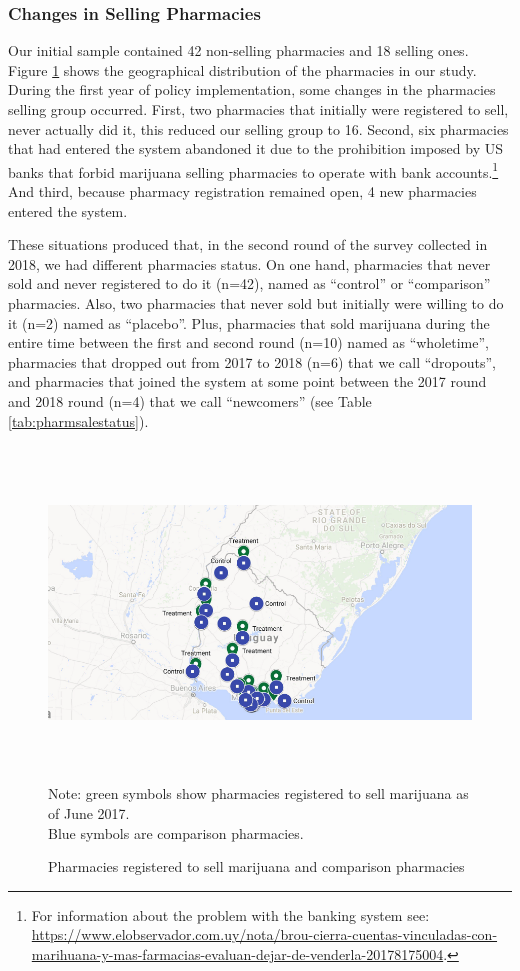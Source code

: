\documentclass[11pt]{article}
\begin{document}
\subsubsection{Changes in Selling Pharmacies}
Our initial sample contained 42 non-selling pharmacies and 18 selling ones. Figure \ref{fig:ctrltrtpharms_1} shows the geographical distribution of the pharmacies in our study. During the first year of policy implementation, some changes in the pharmacies selling group occurred. First, two pharmacies that initially were registered to sell, never actually did it, this reduced our selling group to 16.  Second, six pharmacies that had entered the system abandoned it due to the prohibition imposed by US banks that forbid marijuana selling pharmacies to operate with bank accounts.\footnote{For information about the problem with the banking system see: \url{https://www.elobservador.com.uy/nota/brou-cierra-cuentas-vinculadas-con-marihuana-y-mas-farmacias-evaluan-dejar-de-venderla-20178175004}.} And third, because pharmacy registration remained open, 4 new pharmacies entered the system. 

These situations produced that, in the second round of the survey collected in 2018, we had different pharmacies status. On one hand, pharmacies that never sold and never registered to do it (n=42), named as ``control'' or ``comparison'' pharmacies. Also, two pharmacies that never sold but initially were willing to do it (n=2) named as ``placebo''. Plus, pharmacies that sold marijuana during the entire time between the first and second round (n=10) named as ``wholetime'', pharmacies that dropped out from 2017 to 2018 (n=6) that we call ``dropouts'', and pharmacies that joined the system at some point between the 2017 round and 2018 round (n=4) that we call ``newcomers'' (see Table \ref{tab:pharmsalestatus}).

\begin{figure}[htpb!]
    \centering
    \label{fig:ctrltrtpharms_1}
    \caption{Pharmacies registered to sell marijuana and comparison pharmacies}
    \includegraphics[width=6.5in,height=3.4851in]{./media/country.png}
\footnotesize{Note: green symbols show pharmacies registered to sell marijuana as of June 2017. \\ Blue symbols are comparison pharmacies.}
\end{figure}
\end{document}
